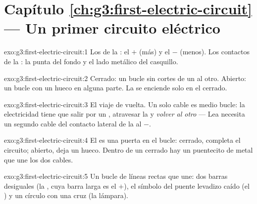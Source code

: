 \section*{Capítulo \ref{ch:g3:first-electric-circuit} --- Un primer circuito eléctrico}

\begin{solution}{exo:g3:first-electric-circuit:1}
Los  de la : el $+$ (más) y el $-$ (menos). Los
contactos de la : la punta del fondo y el lado
metálico del casquillo.
\end{solution}

\begin{solution}{exo:g3:first-electric-circuit:2}
Cerrado: un bucle sin cortes de un  al otro. Abierto: un bucle con
un hueco en alguna parte. La  se enciende solo en el
cerrado.
\end{solution}

\begin{solution}{exo:g3:first-electric-circuit:3}
El viaje de vuelta. Un solo cable es medio bucle: la electricidad
tiene que salir por un , atravesar la  y \emph{volver
al otro } --- Lea necesita un segundo cable del contacto
lateral de la  al  $-$.
\end{solution}

\begin{solution}{exo:g3:first-electric-circuit:4}
El  es una puerta en el bucle: cerrado, completa el
circuito; abierto, deja un hueco. Dentro de un  cerrado
hay un puentecito de metal que une los dos cables.
\end{solution}

\begin{solution}{exo:g3:first-electric-circuit:5}
Un bucle de líneas rectas que une: dos barras desiguales (la
, cuya barra larga es el $+$), el símbolo del puente levadizo
caído (el ) y un círculo con una cruz (la lámpara).
\end{solution}


